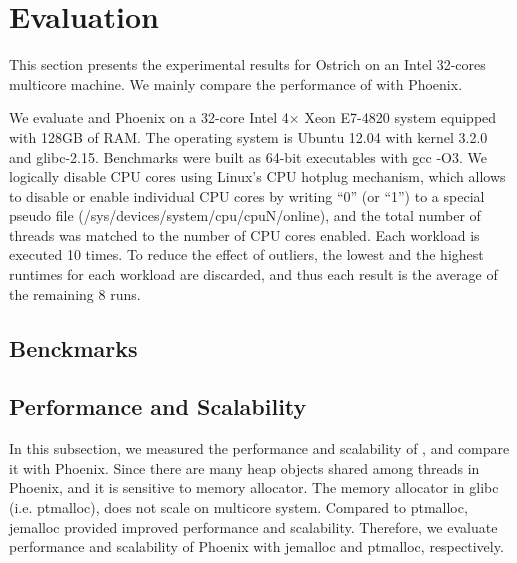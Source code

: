 \section{Evaluation}
This section presents the experimental results for Ostrich on an Intel 32-cores multicore machine. 
We mainly compare the performance of \myds with Phoenix.

We evaluate \myds and Phoenix on a 32-core Intel 4× Xeon E7-4820 system equipped with 128GB of RAM. 
The operating system is Ubuntu 12.04 with kernel 3.2.0 and glibc-2.15.
Benchmarks were built as 64-bit executables with gcc -O3.
We logically disable CPU cores using Linux’s CPU hotplug mechanism, which allows to disable or enable individual CPU cores by writing “0” (or “1”) to a special pseudo file (/sys/devices/system/cpu/cpuN/online), and the total number of threads was matched to the number of CPU cores enabled.
Each workload is executed 10 times. 
To reduce the effect of outliers, the lowest and the highest runtimes for each workload are discarded, and thus each result is the average of the remaining 8 runs.

\subsection{Benckmarks}
\subsection{Performance and Scalability}
In this subsection, we measured the performance and scalability of \myds, and compare it with Phoenix.  
Since there are many heap objects shared among threads in Phoenix, and it is sensitive to memory allocator.
The memory allocator in glibc (i.e. ptmalloc\cite{gloger1997ptmalloc}), does not scale on multicore system. 
Compared to ptmalloc\cite{gloger1997ptmalloc}, jemalloc provided improved performance and scalability\cite{evans2006jemalloc}. 
Therefore, we evaluate performance and scalability of Phoenix with jemalloc and ptmalloc, respectively.

